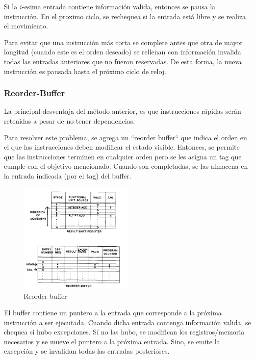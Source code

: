 Si la $i$-esima entrada contiene información valida, entonces se pausa la instrucción. En el proximo ciclo, se rechequea si la entrada está libre y se realiza el movimiento.

Para evitar que una instrucción más corta se complete antes que otra de mayor longitud (cuando este es el orden deseado) se rellenan con información invalida todas las entradas anteriores que no fueron reservadas. De esta forma, la nueva instrucción es pausada hasta el próximo ciclo de reloj.

\subsubsection{Reorder-Buffer}
La principal desventaja del método anterior, es que instrucciones rápidas serán retenidas a pesar de no tener dependencias.

Para resolver este problema, se agrega un ``reorder buffer`` que indica el orden en el que las instrucciones deben modificar el estado visible. Entonces, se permite que las instrucciones terminen en cualquier orden pero se les asigna un tag que cumple con el objetivo mencionado. Cuando son completadas, se las almacena en la entrada indicada (por el tag) del buffer.

\begin{figure}[ht]
	\centering
	\includegraphics[width=0.5\textwidth]{imagenes/reorder-buffer}
	\caption{Reorder buffer}
	\label{fig:reorder-buffer}
\end{figure}

El buffer contiene un puntero a la entrada que corresponde a la próxima instrucción a ser ejecutada. Cuando dicha entrada contenga información valida, se  chequea si hubo excepciones. Sí no las hubo, se modifican los registros/memoria necesarios y se mueve el puntero a la próxima entrada. Sino, se emite la excepción y se invalidan todas las entradas posteriores.

